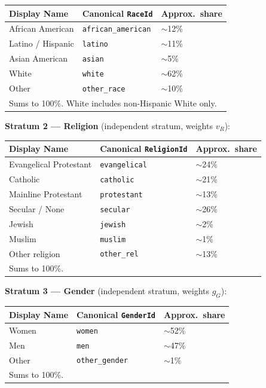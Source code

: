 \documentclass[11pt]{article}
\begin{document}
\begin{center}
\begin{tabular}{lll}
\toprule
\textbf{Display Name} & \textbf{Canonical \texttt{RaceId}} & \textbf{Approx.\ share} \\
\midrule
African American & \texttt{african\_american} & $\sim$12\% \\
Latino / Hispanic & \texttt{latino}           & $\sim$11\% \\
Asian American    & \texttt{asian}            & $\sim$5\%  \\
White             & \texttt{white}            & $\sim$62\% \\
Other             & \texttt{other\_race}      & $\sim$10\% \\
\bottomrule
\multicolumn{3}{l}{\small Sums to 100\%. White includes non-Hispanic White only.} \\
\end{tabular}
\end{center}

\noindent\textbf{Stratum 2 --- Religion} (independent stratum, weights $v_R$):

\begin{center}
\begin{tabular}{lll}
\toprule
\textbf{Display Name} & \textbf{Canonical \texttt{ReligionId}} & \textbf{Approx.\ share} \\
\midrule
Evangelical Protestant & \texttt{evangelical} & $\sim$24\% \\
Catholic               & \texttt{catholic}    & $\sim$21\% \\
Mainline Protestant    & \texttt{protestant}  & $\sim$13\% \\
Secular / None         & \texttt{secular}     & $\sim$26\% \\
Jewish                 & \texttt{jewish}      & $\sim$2\%  \\
Muslim                 & \texttt{muslim}      & $\sim$1\%  \\
Other religion         & \texttt{other\_rel}  & $\sim$13\% \\
\bottomrule
\multicolumn{3}{l}{\small Sums to 100\%.} \\
\end{tabular}
\end{center}

\noindent\textbf{Stratum 3 --- Gender} (independent stratum, weights $g_G$):

\begin{center}
\begin{tabular}{lll}
\toprule
\textbf{Display Name} & \textbf{Canonical \texttt{GenderId}} & \textbf{Approx.\ share} \\
\midrule
Women & \texttt{women} & $\sim$52\% \\
Men   & \texttt{men}   & $\sim$47\% \\
Other & \texttt{other\_gender} & $\sim$1\% \\
\bottomrule
\multicolumn{3}{l}{\small Sums to 100\%.} \\
\end{tabular}
\end{center}
\end{document}
